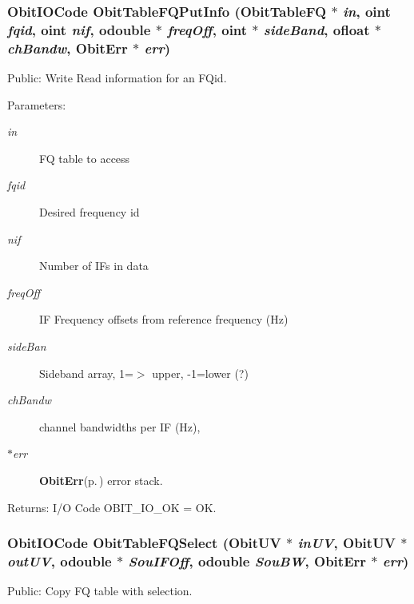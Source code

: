 \subsubsection{\setlength{\rightskip}{0pt plus 5cm}Obit\-IOCode Obit\-Table\-FQPut\-Info ({\bf Obit\-Table\-FQ} $\ast$ {\em in}, {\bf oint} {\em fqid}, {\bf oint} {\em nif}, {\bf odouble} $\ast$ {\em freq\-Off}, {\bf oint} $\ast$ {\em side\-Band}, {\bf ofloat} $\ast$ {\em ch\-Bandw}, {\bf Obit\-Err} $\ast$ {\em err})}\label{ObitTableFQUtil_8h_a1}


Public: Write Read information for an FQid. 

\begin{Desc}
\item[Parameters:]
\begin{description}
\item[{\em in}]FQ table to access \item[{\em fqid}]Desired frequency id \item[{\em nif}]Number of IFs in data \item[{\em freq\-Off}]IF Frequency offsets from reference frequency (Hz) \item[{\em side\-Ban}]Sideband array, 1=$>$ upper, -1=lower (?) \item[{\em ch\-Bandw}]channel bandwidths per IF (Hz), \item[{\em $\ast$err}]{\bf Obit\-Err}{\rm (p.\,\pageref{structObitErr})} error stack. \end{description}
\end{Desc}
\begin{Desc}
\item[Returns:]I/O Code OBIT\_\-IO\_\-OK = OK. \end{Desc}
\subsubsection{\setlength{\rightskip}{0pt plus 5cm}Obit\-IOCode Obit\-Table\-FQSelect ({\bf Obit\-UV} $\ast$ {\em in\-UV}, {\bf Obit\-UV} $\ast$ {\em out\-UV}, {\bf odouble} $\ast$ {\em Sou\-IFOff}, {\bf odouble} {\em Sou\-BW}, {\bf Obit\-Err} $\ast$ {\em err})}\label{ObitTableFQUtil_8h_a2}


Public: Copy FQ table with selection. 


